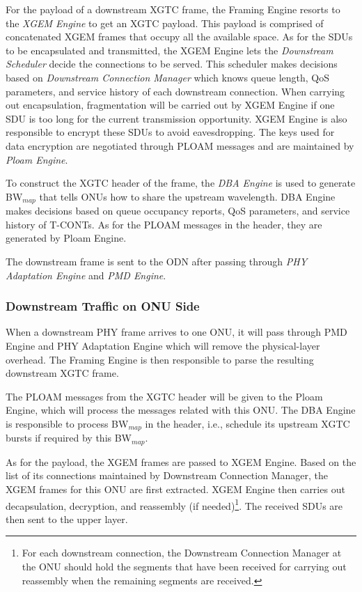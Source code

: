 For the payload of a downstream XGTC frame, the Framing Engine
resorts to the \emph{XGEM Engine} to get an XGTC payload. This
payload is comprised of concatenated XGEM frames that occupy all
the available space. As for the SDUs to be encapsulated and
transmitted, the XGEM Engine lets the \emph{Downstream Scheduler}
decide the connections to be served. This scheduler makes
decisions based on \emph{Downstream Connection Manager} which
knows queue length, QoS parameters, and service history of each
downstream connection. When carrying out encapsulation,
fragmentation will be carried out by XGEM Engine if one SDU is too
long for the current transmission opportunity. XGEM Engine is also
responsible to encrypt these SDUs to avoid eavesdropping. The keys
used for data encryption are negotiated through PLOAM messages and
are maintained by \emph{Ploam Engine}.

To construct the XGTC header of the frame, the \emph{DBA Engine}
is used to generate BW$_{map}$ that tells ONUs how to share the
upstream wavelength. DBA Engine makes decisions based on queue
occupancy reports, QoS parameters, and service history of T-CONTs.
As for the PLOAM messages in the header, they are generated by
Ploam Engine.

The downstream frame is sent to the ODN after passing through
\emph{PHY Adaptation Engine} and \emph{PMD Engine}.


\subsubsection{Downstream Traffic on ONU Side}

When a downstream PHY frame arrives to one ONU, it will pass
through PMD Engine and PHY Adaptation Engine which will remove the
physical-layer overhead. The Framing Engine is then responsible to
parse the resulting downstream XGTC frame.

The PLOAM messages from the XGTC header will be given to the Ploam
Engine, which will process the messages related with this ONU. The
DBA Engine is responsible to process BW$_{map}$ in the header,
i.e., schedule its upstream XGTC bursts if required by this
BW$_{map}$.

As for the payload, the XGEM frames are passed to XGEM Engine.
Based on the list of its connections maintained by Downstream
Connection Manager, the XGEM frames for this ONU are first
extracted. XGEM Engine then carries out decapsulation, decryption,
and reassembly (if needed)\footnote{For each downstream
connection, the Downstream Connection Manager at the ONU should
hold the segments that have been received for carrying out
reassembly when the remaining segments are received.}. The
received SDUs are then sent to the upper layer.



